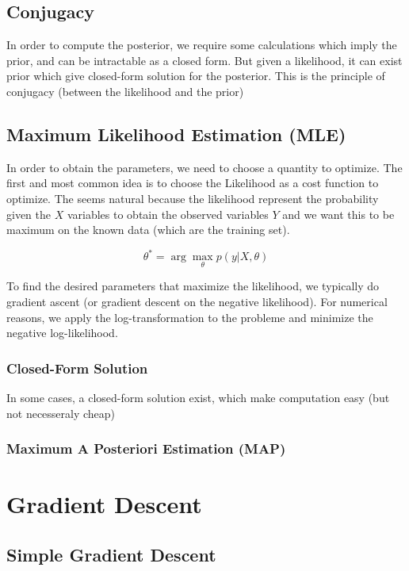 	\subsection{Conjugacy} %
	\label{sub:conjugacy}
		In order to compute the posterior, we require some calculations which imply the prior, and can be intractable as a closed form. But given a likelihood, it can exist prior which give closed-form solution for the posterior. This is the principle of conjugacy (between the likelihood and the prior)

	\subsection{Maximum Likelihood Estimation (MLE)}
	In order to obtain the parameters, we need to choose a quantity to optimize. The first and most common idea is to choose the Likelihood as a cost function to optimize. The seems natural because the likelihood represent the probability given the $X$ variables to obtain the observed variables $Y$ and we want this to be maximum on the known data (which are the training set).

	\[
		\theta^* = \arg \max_{\theta} p(y | X, \theta)
	\]

	To find the desired parameters that maximize the likelihood, we typically do gradient ascent (or gradient descent on the negative likelihood). For numerical reasons, we apply the log-transformation to the probleme and minimize the negative log-likelihood. 

	\subsubsection*{Closed-Form Solution}

			In some cases, a closed-form solution exist, which make computation easy (but not necesseraly cheap)
	\subsubsection{Maximum A Posteriori Estimation (MAP)}

\section{Gradient Descent}

	\subsection{Simple Gradient Descent}

